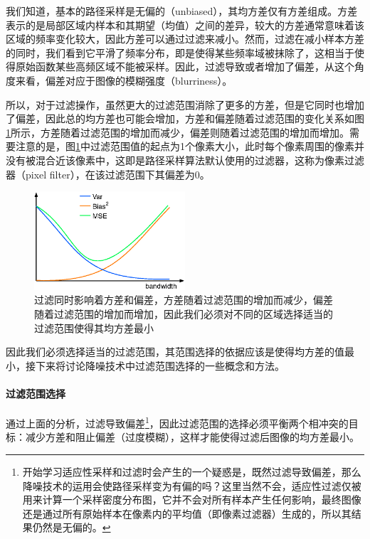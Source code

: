 我们知道，基本的路径采样是无偏的（unbiased），其均方差仅有方差组成。方差表示的是局部区域内样本和其期望（均值）之间的差异，较大的方差通常意味着该区域的频率变化较大，因此方差可以通过过滤来减小。然而，过滤在减小样本方差的同时，我们看到它平滑了频率分布，即是使得某些频率域被抹除了，这相当于使得原始函数某些高频区域不能被采样。因此，过滤导致或者增加了偏差，从这个角度来看，偏差对应于图像的模糊强度（blurriness）。

所以，对于过滤操作，虽然更大的过滤范围消除了更多的方差，但是它同时也增加了偏差，因此总的均方差也可能会增加，方差和偏差随着过滤范围的变化关系如图\ref{f:pt-var-and-bias}所示，方差随着过滤范围的增加而减少，偏差则随着过滤范围的增加而增加。需要注意的是，图\ref{f:pt-var-and-bias}中过滤范围值的起点为1个像素大小，此时每个像素周围的像素并没有被混合近该像素中，这即是路径采样算法默认使用的过滤器，这称为像素过滤器（pixel filter），在该过滤范围下其偏差为0。

\begin{figure}
	\sidecaption
	\includegraphics[width=0.5\textwidth]{figures/pt/var-and-bias.eps}
	\caption{过滤同时影响着方差和偏差，方差随着过滤范围的增加而减少，偏差随着过滤范围的增加而增加，因此我们必须对不同的区域选择适当的过滤范围使得其均方差最小}
	\label{f:pt-var-and-bias}
\end{figure}

因此我们必须选择适当的过滤范围，其范围选择的依据应该是使得均方差的值最小，接下来将讨论降噪技术中过滤范围选择的一些概念和方法。





\paragraph{过滤范围选择}
通过上面的分析，过滤导致偏差\footnote{开始学习适应性采样和过滤时会产生的一个疑惑是，既然过滤导致偏差，那么降噪技术的运用会使路径采样变为有偏的吗？这里当然不会，适应性过滤仅被用来计算一个采样密度分布图，它并不会对所有样本产生任何影响，最终图像还是通过所有原始样本在像素内的平均值（即像素过滤器）生成的，所以其结果仍然是无偏的。}，因此过滤范围的选择必须平衡两个相冲突的目标：减少方差和阻止偏差（过度模糊），这样才能使得过滤后图像的均方差最小。

